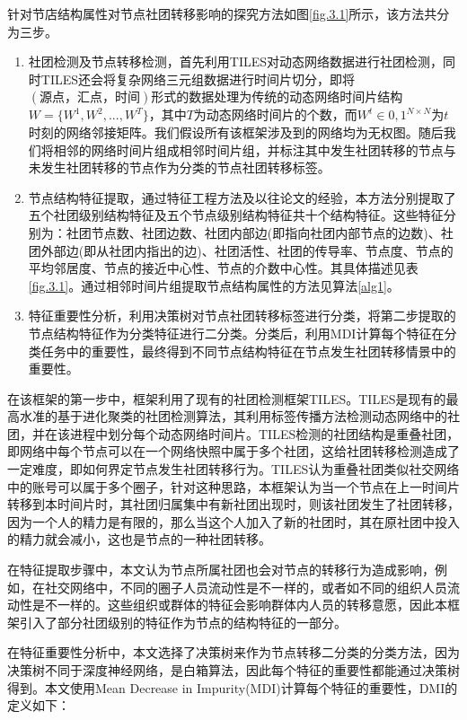 针对节店结构属性对节点社团转移影响的探究方法如图\ref{fig.3.1}所示，该方法共分为三步。
\begin{enumerate}
	\item 社团检测及节点转移检测，首先利用TILES\cite{rossetti2017tiles}对动态网络数据进行社团检测，同时TILES还会将复杂网络三元组数据进行时间片切分，即将$(源点，汇点，时间)$形式的数据处理为传统的动态网络时间片结构$W=\{W^1,W^2,...,W^T\}$，其中$T$为动态网络时间片的个数，而$W^t \in {0,1}^{N \times N}$为$t$时刻的网络邻接矩阵。我们假设所有该框架涉及到的网络均为无权图。随后我们将相邻的网络时间片组成相邻时间片组，并标注其中发生社团转移的节点与未发生社团转移的节点作为分类的节点社团转移标签。
	\item 节点结构特征提取，通过特征工程方法及以往论文的经验\cite{ilhan2016feature}，本方法分别提取了五个社团级别结构特征及五个节点级别结构特征共十个结构特征。这些特征分别为：社团节点数、社团边数、社团内部边(即指向社团内部节点的边数)、社团外部边(即从社团内指出的边)、社团活性、社团的传导率、节点度、节点的平均邻居度、节点的接近中心性、节点的介数中心性。其具体描述见表\ref{fig.3.1}。通过相邻时间片组提取节点结构属性的方法见算法\ref{alg1}。
	\item 特征重要性分析，利用决策树对节点社团转移标签进行分类，将第二步提取的节点结构特征作为分类特征进行二分类。分类后，利用MDI计算每个特征在分类任务中的重要性，最终得到不同节点结构特征在节点发生社团转移情景中的重要性。
\end{enumerate}

在该框架的第一步中，框架利用了现有的社团检测框架TILES。TILES是现有的最高水准的基于进化聚类的社团检测算法，其利用标签传播方法检测动态网络中的社团，并在该进程中划分每个动态网络时间片。TILES检测的社团结构是重叠社团，即网络中每个节点可以在一个网络快照中属于多个社团，这给社团转移检测造成了一定难度，即如何界定节点发生社团转移行为。TILES认为重叠社团类似社交网络中的账号可以属于多个圈子，针对这种思路，本框架认为当一个节点在上一时间片转移到本时间片时，其社团归属集中有新社团出现时，则该社团发生了社团转移，因为一个人的精力是有限的，那么当这个人加入了新的社团时，其在原社团中投入的精力就会减小，这也是节点的一种社团转移。

在特征提取步骤中，本文认为节点所属社团也会对节点的转移行为造成影响，例如，在社交网络中，不同的圈子人员流动性是不一样的，或者如不同的组织人员流动性是不一样的。这些组织或群体的特征会影响群体内人员的转移意愿，因此本框架引入了部分社团级别的特征作为节点的结构特征的一部分。

在特征重要性分析中，本文选择了决策树来作为节点转移二分类的分类方法，因为决策树不同于深度神经网络，是白箱算法，因此每个特征的重要性都能通过决策树得到。本文使用Mean Decrease in Impurity(MDI)\cite{menze2009comparison}计算每个特征的重要性，DMI的定义如下：

